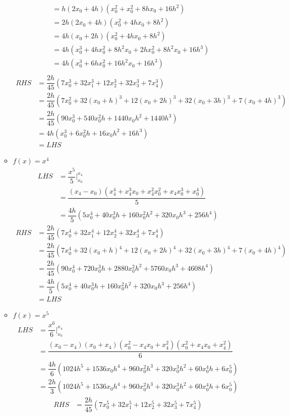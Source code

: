 \documentclass{article}
\begin{document}
\begin{enumerate}
\begin{itemize}
\begin{align*}
&=h(2x_0+4h)(x_0^2+x_0^2+8hx_0+16h^2)\\
&=2h(2x_0+4h)(x_0^2+4hx_0+8h^2)\\
&=4h(x_0+2h)(x_0^2+4hx_0+8h^2)\\
&=4h(x_0^3+4hx_0^2+8h^2x_0+2hx_0^2+8h^2x_0+16h^3)\\
&=4h(x_0^3+6hx_0^2+16h^2x_0+16h^3)\\
\end{align*}
\begin{align*}
RHS &=\dfrac{2h}{45}(7x_0^3+32x_1^3+12x_2^3+32x_3^3+7x_4^3)\\
&=\dfrac{2h}{45}(7x_0^2+32(x_0+h)^3+12(x_0+2h)^3+32(x_0+3h)^3+7(x_0+4h)^3)\\
&=\dfrac{2h}{45}(90x_0^3+540x_0^2h+1440x_0h^2+1440h^3)\\
&=4h(x_0^3+6x_0^2h+16x_0h^2+16h^3)\\&=LHS
\end{align*}
\item $f(x) = x^4$
\begin{align*}
LHS &=\dfrac{x^5}{5}|_{x_0}^{x_4}\\
&=\dfrac{(x_4 - x_0) (x_4^4 + x_4^3 x_0 + x_4^2 x_0^2 + x_4 x_0^3 + x_0^4)}{5}\\
&=\dfrac{4h}{5}(5x_0^4+40x_0^3h+160x_0^2h^2+320x_0h^3+256h^4)
\end{align*}
\begin{align*}
RHS &=\dfrac{2h}{45}(7x_0^4+32x_1^4+12x_2^4+32x_3^4+7x_4^4)\\
&=\dfrac{2h}{45}(7x_0^4+32(x_0+h)^4+12(x_0+2h)^4+32(x_0+3h)^4+7(x_0+4h)^4)\\
&=\dfrac{2h}{45}(90x_0^4+720x_0^3h+2880x_0^2h^2+5760x_0h^3+4608h^4)\\
&=\dfrac{4h}{5}(5x_0^4+40x_0^3h+160x_0^2h^2+320x_0h^3+256h^4)\\&=LHS
\end{align*}
\item $f(x) = x^5$
\begin{align*}
LHS &=\dfrac{x^6}{6}|_{x_0}^{x_4}\\
&=\dfrac{(x_0 - x_4) (x_0 + x_4) (x_0^2 - x_4 x_0 + x_4^2) (x_0^2 + x_4 x_0 + x_4^2)}{6}\\
&=\dfrac{4h}{6}(1024 h^5 + 1536 x_0h^4 + 960 x_0^2h^3 + 320 x_0^3h^2 + 60 x_0^4h + 6x_0^5)\\
&=\dfrac{2h}{3}(1024 h^5 + 1536 x_0h^4 + 960 x_0^2h^3 + 320 x_0^3h^2 + 60 x_0^4h + 6x_0^5)
\end{align*}\begin{align*}
RHS &=\dfrac{2h}{45}(7x_0^5+32x_1^5+12x_2^5+32x_3^5+7x_4^5)\\

\end{align*}
\end{itemize}
\end{enumerate}
\end{document}
